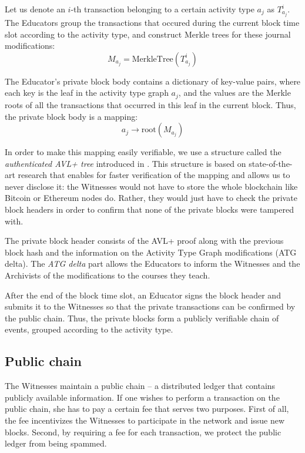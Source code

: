 Let us denote an $i$-th transaction belonging to a certain activity type $a_j$ as $T_{a_j}^i$. The Educators group the transactions that occured during the current block time slot according to the activity type, and construct Merkle trees \cite{merkle1989certified} for these journal modifications:
\begin{equation}
M_{a_j} = \textrm{MerkleTree}(T_{a_j}^i)
\end{equation}

The Educator's private block body contains a dictionary of key-value pairs, where each key is the leaf in the activity type graph $a_j$, and the values are the Merkle roots of all the transactions that occurred in this leaf in the current block. Thus, the private block body is a mapping:
\begin{equation}
a_j \rightarrow \textrm{root}(M_{a_j})
\end{equation}

In order to make this mapping easily verifiable, we use a structure called the \textit{authenticated AVL+ tree} introduced in \cite{reyzin2016improving}. This structure is based on state-of-the-art research that enables for faster verification of the mapping and allows us to never disclose it: the Witnesses would not have to store the whole blockchain like Bitcoin or Ethereum nodes do. Rather, they would just have to check the private block headers in order to confirm that none of the private blocks were tampered with.

The private block header consists of the AVL+ proof along with the previous block hash and the information on the Activity Type Graph modifications (ATG delta). The \textit{ATG delta} part allows the Educators to inform the Witnesses and the Archivists of the modifications to the courses they teach.

After the end of the block time slot, an Educator signs the block header and submits it to the Witnesses so that the private transactions can be confirmed by the public chain. Thus, the private blocks form a publicly verifiable chain of events, grouped according to the activity type.

\subsection{Public chain}
The Witnesses maintain a public chain -- a distributed ledger that contains publicly available information. If one wishes to perform a transaction on the public chain, she has to pay a certain fee that serves two purposes. First of all, the fee incentivizes the Witnesses to participate in the network and issue new blocks. Second, by requiring a fee for each transaction, we protect the public ledger from being spammed.

